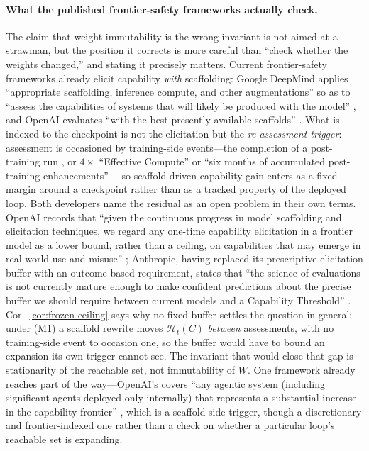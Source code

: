 \paragraph{What the published frontier-safety frameworks actually check.} The claim that weight-immutability is the wrong invariant is not aimed at a strawman, but the position it corrects is more careful than ``check whether the weights changed,'' and stating it precisely matters. Current frontier-safety frameworks already elicit capability \emph{with} scaffolding: Google DeepMind applies ``appropriate scaffolding, inference compute, and other augmentations'' so as to ``assess the capabilities of systems that will likely be produced with the model'' \citep{deepmind2026fsf}, and OpenAI evaluates ``with the best presently-available scaffolds'' \citep{openai2025preparedness}. What is indexed to the checkpoint is not the elicitation but the \emph{re-assessment trigger}: assessment is occasioned by training-side events---the completion of a post-training run \citep{deepmind2026fsf}, or $4\times$ ``Effective Compute'' or ``six months of accumulated post-training enhancements'' \citep{anthropic2026rsp}---so scaffold-driven capability gain enters as a fixed margin around a checkpoint rather than as a tracked property of the deployed loop. Both developers name the residual as an open problem in their own terms. OpenAI records that ``given the continuous progress in model scaffolding and elicitation techniques, we regard any one-time capability elicitation in a frontier model as a lower bound, rather than a ceiling, on capabilities that may emerge in real world use and misuse'' \citep{openai2025preparedness}; Anthropic, having replaced its prescriptive elicitation buffer with an outcome-based requirement, states that ``the science of evaluations is not currently mature enough to make confident predictions about the precise buffer we should require between current models and a Capability Threshold'' \citep{anthropic2026rsp}. Cor.~\ref{cor:frozen-ceiling} says why no fixed buffer settles the question in general: under (M1) a scaffold rewrite moves $\mathcal{H}_t(C)$ \emph{between} assessments, with no training-side event to occasion one, so the buffer would have to bound an expansion its own trigger cannot see. The invariant that would close that gap is stationarity of the reachable set, not immutability of $W$. One framework already reaches part of the way---OpenAI's covers ``any agentic system (including significant agents deployed only internally) that represents a substantial increase in the capability frontier'' \citep{openai2025preparedness}, which is a scaffold-side trigger, though a discretionary and frontier-indexed one rather than a check on whether a particular loop's reachable set is expanding.

